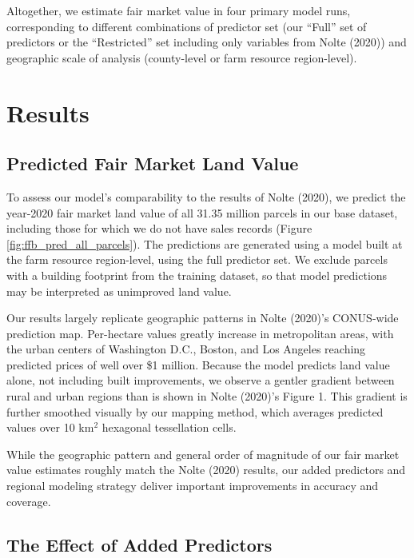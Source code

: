 \documentclass[12pt]{article}
\begin{document}
Altogether, we estimate fair market value in four primary model runs, corresponding to different combinations of predictor set (our ``Full'' set of predictors or the ``Restricted'' set including only variables from Nolte (2020)) and geographic scale of analysis (county-level or farm resource region-level). 

\section{Results}

\subsection{Predicted Fair Market Land Value}

To assess our model's comparability to the results of Nolte (2020), we predict the year-2020 fair market land value of all 31.35 million parcels in our base dataset, including those for which we do not have sales records (Figure \ref{fig:ffb_pred_all_parcels}). The predictions are generated using a model built at the farm resource region-level, using the full predictor set. We exclude parcels with a building footprint from the training dataset, so that model predictions may be interpreted as unimproved land value.

Our results largely replicate geographic patterns in Nolte (2020)'s CONUS-wide prediction map. Per-hectare values greatly increase in metropolitan areas, with the urban centers of Washington D.C., Boston, and Los Angeles reaching predicted prices of well over \$1 million. Because the model predicts land value alone, not including built improvements, we observe a gentler gradient between rural and urban regions than is shown in Nolte (2020)'s Figure 1. This gradient is further smoothed visually by our mapping method, which averages predicted values over 10 km$^2$ hexagonal tessellation cells. 

While the geographic pattern and general order of magnitude of our fair market value estimates roughly match the Nolte (2020) results, our added predictors and regional modeling strategy deliver important improvements in accuracy and coverage. 

\subsection{The Effect of Added Predictors}
\end{document}
